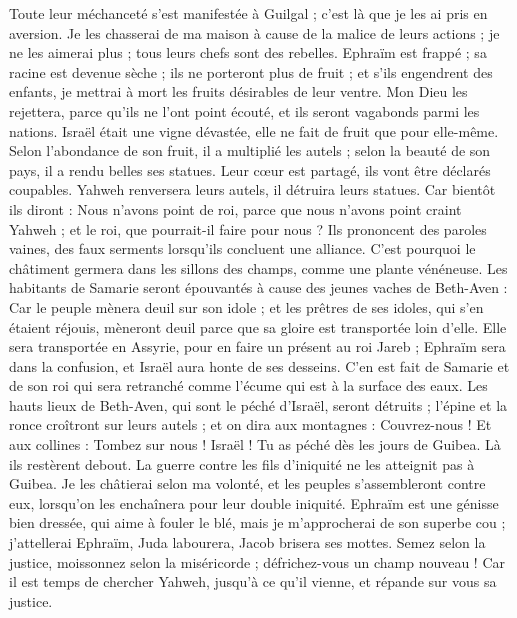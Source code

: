 \begin{multicols}{2}
Toute leur méchanceté s'est manifestée à Guilgal ; c'est là que je les ai pris en aversion. Je les chasserai de ma maison à cause de la malice de leurs actions ; je ne les aimerai plus ; tous leurs chefs sont des rebelles.
Ephraïm est frappé ; sa racine est devenue sèche ; ils ne porteront plus de fruit ; et s'ils engendrent des enfants, je mettrai à mort les fruits désirables de leur ventre.
Mon Dieu les rejettera, parce qu'ils ne l'ont point écouté, et ils seront vagabonds parmi les nations.
\VerseOne{}Israël était une vigne dévastée, elle ne fait de fruit que pour elle-même. Selon l'abondance de son fruit, il a multiplié les autels ; selon la beauté de son pays, il a rendu belles ses statues.
Leur cœur est partagé, ils vont être déclarés coupables. Yahweh renversera leurs autels, il détruira leurs statues.
Car bientôt ils diront : Nous n'avons point de roi, parce que nous n'avons point craint Yahweh ; et le roi, que pourrait-il faire pour nous ?
Ils prononcent des paroles vaines, des faux serments lorsqu'ils concluent une alliance. C'est pourquoi le châtiment germera dans les sillons des champs, comme une plante vénéneuse.
Les habitants de Samarie seront épouvantés à cause des jeunes vaches de Beth-Aven : Car le peuple mènera deuil sur son idole ; et les prêtres de ses idoles, qui s'en étaient réjouis, mèneront deuil parce que sa gloire est transportée loin d'elle.
Elle sera transportée en Assyrie, pour en faire un présent au roi Jareb ; Ephraïm sera dans la confusion, et Israël aura honte de ses desseins.
C'en est fait de Samarie et de son roi qui sera retranché comme l'écume qui est à la surface des eaux.
Les hauts lieux de Beth-Aven, qui sont le péché d'Israël, seront détruits ; l'épine et la ronce croîtront sur leurs autels ; et on dira aux montagnes : Couvrez-nous ! Et aux collines : Tombez sur nous !
Israël ! Tu as péché dès les jours de Guibea. Là ils restèrent debout. La guerre contre les fils d'iniquité ne les atteignit pas à Guibea.
Je les châtierai selon ma volonté, et les peuples s'assembleront contre eux, lorsqu'on les enchaînera pour leur double iniquité.
Ephraïm est une génisse bien dressée, qui aime à fouler le blé, mais je m'approcherai de son superbe cou ; j'attellerai Ephraïm, Juda labourera, Jacob brisera ses mottes.
Semez selon la justice, moissonnez selon la miséricorde ; défrichez-vous un champ nouveau ! Car il est temps de chercher Yahweh, jusqu'à ce qu'il vienne, et répande sur vous sa justice.

\end{multicols}
